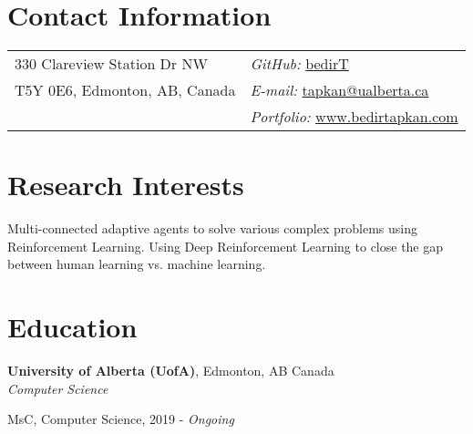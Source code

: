 \documentclass[margin,line]{res}
\newenvironment{list1}{
  \begin{list}{\ding{113}}{%
      \setlength{\itemsep}{0in}
      \setlength{\parsep}{0in} \setlength{\parskip}{0in}
      \setlength{\topsep}{0in} \setlength{\partopsep}{0in} 
      \setlength{\leftmargin}{0.17in}}}{\end{list}}
\newenvironment{list2}{
  \begin{list}{$\bullet$}{%
      \setlength{\itemsep}{0in}
      \setlength{\parsep}{0in} \setlength{\parskip}{0in}
      \setlength{\topsep}{0in} \setlength{\partopsep}{0in} 
      \setlength{\leftmargin}{0.2in}}}{\end{list}}
\begin{document}

\begin{resume}
\section{\sc Contact Information}
\vspace{.05in}
\begin{tabular}{@{}p{3in}p{3in}}
330 Clareview Station Dr NW & \hfill {\it GitHub:}  \href{https://github.com/bedirT}{bedirT} \\
T5Y 0E6, Edmonton, AB, Canada & \hfill {\it E-mail:}  \href{mailto:tapkan@ualberta.ca}{tapkan@ualberta.ca}\\
& \hfill {\it Portfolio:}  \href{www.bedirtapkan.com}{www.bedirtapkan.com} \\
\end{tabular}


\section{\sc Research Interests}
Multi-connected adaptive agents to solve various complex problems using Reinforcement Learning. Using Deep Reinforcement Learning to close the gap between human learning vs. machine learning.

\section{\sc Education}


 {\bf University of Alberta (UofA)}, Edmonton, AB Canada\\
 {\em Computer Science} 
 \begin{list1}
 \item[] MsC, Computer Science, 2019 - \textit{Ongoing}
\end{list1}


\end{resume}
\end{document}
